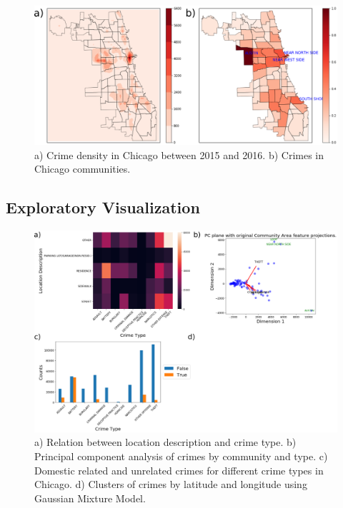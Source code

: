 \documentclass[12pt]{article}
\begin{document}
\begin{figure}[ht]
\includegraphics[scale=0.4]{figure/pos.eps}
\centering
\caption{a) Crime density in Chicago between 2015 and 2016. b) Crimes in Chicago communities.}
\end{figure}

\subsection{Exploratory Visualization}
\begin{figure}[ht]
\includegraphics[scale=0.3]{figure/location.eps}
\centering
\caption{a) Relation between location description and crime type. b) Principal component analysis of crimes by community and type. c) Domestic related and unrelated crimes for different crime types in Chicago. d) Clusters of crimes by latitude and longitude using Gaussian Mixture Model.}
\end{figure}
\end{document}
